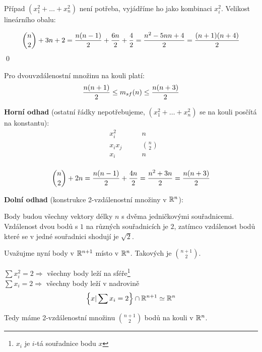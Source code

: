 Případ $(x_1^2+\dots+x_n^2)$ není potřeba, vyjádříme ho jako kombinaci $x_i^2$. Velikost lineárního obalu:

$${n\choose 2} + 3n + 2 = {n(n-1) \over 2} + {6n\over 2} + {4\over 2} = {n^2-5nn+4 \over 2} = {(n+1)(n+4)\over 2}$$ \qed


\vt Pro dvouvzdálenostní množinu na kouli platí: $${n(n+1)\over 2} \leq m_{sf}(n) \leq {n(n+3)\over 2}$$

\dk

{\bf Horní odhad} (ostatní řádky nepotřebujeme, $(x_1^2 + \dots + x_n^2)$ se na kouli posčítá na konstantu):
\begin{align}
	&x_i^2 &\qquad n\\
	&x_ix_j &\qquad {n \choose 2}\\
	&x_i &\qquad n\\
\end{align}

$${n\choose 2} + 2n = {n(n-1)\over 2} + {4n\over 2} = {n^2+3n\over 2} = {n(n+3) \over 2}$$

{\bf Dolní odhad} (konstrukce 2-vzdálenostní množiny v $\mathbb{R}^n$):

Body budou všechny vektory délky $n$ s dvěma jedničkovými souřadnicemi. Vzdálenost dvou bodů s $1$ na různých souřadnicích je $2$, zatímco vzdálenost bodů které se v jedné souřadnici shodují je $\sqrt 2$.

Uvažujme nyní body v $\mathbb{R}^{n+1}$ místo v $\mathbb{R}^n$. Takových je $n+1 \choose 2$. 

\bigskip
$\sum x_i^2 = 2 \Rightarrow$ všechny body leží na sféře\footnote{$x_i$ je $i$-tá souřadnice bodu $x$}\\
\indent$\sum x_i = 2 \Rightarrow$ všechny body leží v nadrovině \\

$$\left\{x | \sum x_i = 2 \right\} \cap \mathbb{R}^{n+1} \simeq \mathbb{R}^n$$

Tedy máme 2-vzdálenostní množinu $n+1 \choose 2$ bodů na kouli v $\mathbb{R}^n$.


